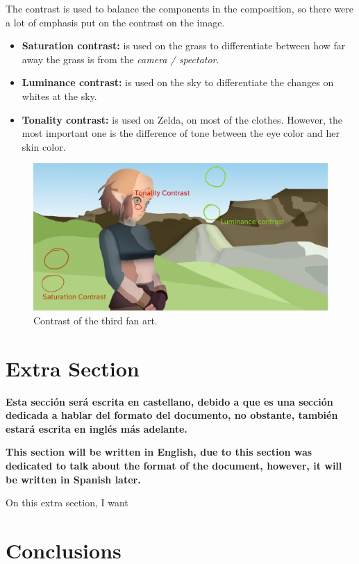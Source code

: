 \documentclass{cup-pan}
\begin{document}
            The contrast is used to balance the components in the composition, so there were a lot of emphasis put on the contrast on the image.\\
            \begin{itemize}
                \item \textbf{Saturation contrast:} is used on the grass to differentiate between how far away the grass is from the \textit{camera / spectator}.
                \item \textbf{Luminance contrast: } is used on the sky to differentiate the changes on whites at the sky. 
                \item \textbf{Tonality contrast: } is used on Zelda, on most of the clothes. However, the most important one is the difference of tone between the eye color and her skin color. 
            \end{itemize}
            \begin{figure}[H]
                \includegraphics[width=\textwidth]{Fanart3/0_Analisi/contrast.png}
                \caption{Contrast of the third fan art.}
            \end{figure}



    \newpage
\newpage

\section{Extra Section}

    \textbf{Esta sección será escrita en castellano, debido a que es una sección dedicada a hablar del formato del documento, no obstante, también estará escrita en inglés más adelante.\\}

    \textbf{This section will be written in English, due to this section was dedicated to talk about the format of the document, however, it will be written in Spanish later.\\}

    On this extra section, I want 

\section{Conclusions}

\newpage
\end{document}
